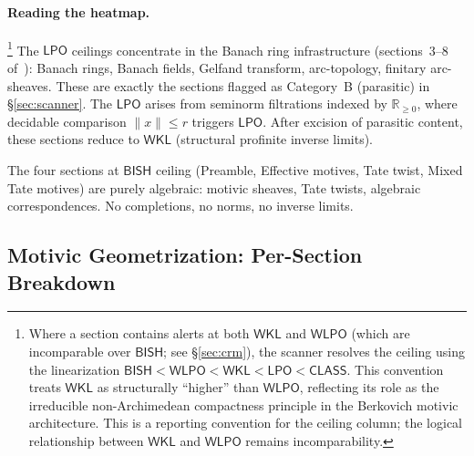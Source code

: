 \documentclass[11pt,a4paper]{article}
\theoremstyle{plain}
\theoremstyle{definition}
\newcommand{\BISH}{\textsf{BISH}}
\newcommand{\WKL}{\textsf{WKL}}
\newcommand{\WLPO}{\textsf{WLPO}}
\newcommand{\LPO}{\textsf{LPO}}
\newcommand{\CLASS}{\textsf{CLASS}}
\newcommand{\R}{\mathbb{R}}
\begin{document}
\paragraph{Reading the heatmap.}\footnote{Where a section contains alerts at both $\WKL$ and $\WLPO$ (which are incomparable over $\BISH$; see \S\ref{sec:crm}), the scanner resolves the ceiling using the linearization $\BISH < \WLPO < \WKL < \LPO < \CLASS$.  This convention treats $\WKL$ as structurally ``higher'' than $\WLPO$, reflecting its role as the irreducible non-Archimedean compactness principle in the Berkovich motivic architecture.  This is a reporting convention for the ceiling column; the logical relationship between $\WKL$ and $\WLPO$ remains incomparability.}
The $\LPO$ ceilings concentrate in the Banach ring infrastructure (sections~3--8 of~\cite{scholze-berkovich}): Banach rings, Banach fields, Gelfand transform, arc-topology, finitary arc-sheaves.  These are exactly the sections flagged as Category~B (parasitic) in \S\ref{sec:scanner}.  The $\LPO$ arises from seminorm filtrations indexed by $\R_{\geq 0}$, where decidable comparison $\|x\| \leq r$ triggers $\LPO$.  After excision of parasitic content, these sections reduce to $\WKL$ (structural profinite inverse limits).

The four sections at $\BISH$ ceiling (Preamble, Effective motives, Tate twist, Mixed Tate motives) are purely algebraic: motivic sheaves, Tate twists, algebraic correspondences.  No completions, no norms, no inverse limits.

\subsection{Motivic Geometrization: Per-Section Breakdown}
\end{document}
